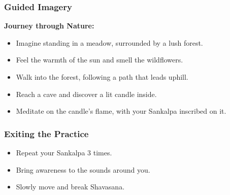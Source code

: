 \begin{frame}[fragile]\frametitle{Guided Imagery}
    \textbf{Journey through Nature:}
    \begin{itemize}
        \item Imagine standing in a meadow, surrounded by a lush forest.
        \item Feel the warmth of the sun and smell the wildflowers.
        \item Walk into the forest, following a path that leads uphill.
        \item Reach a cave and discover a lit candle inside.
        \item Meditate on the candle's flame, with your Sankalpa inscribed on it.
    \end{itemize}
\end{frame}

\begin{frame}[fragile]\frametitle{Exiting the Practice}
    \begin{itemize}
        \item Repeat your Sankalpa 3 times.
        \item Bring awareness to the sounds around you.
        \item Slowly move and break Shavasana.
    \end{itemize}
\end{frame}
